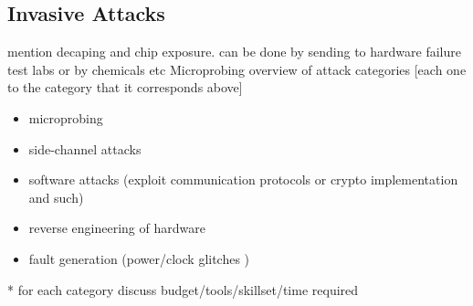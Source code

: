 \documentclass[10pt,a4paper,twocolumn]{article}
\begin{document}
	\subsection{Invasive Attacks}
	mention decaping and chip exposure. can be done by sending to hardware failure test labs\citep{website:hacking_the_pic} or by chemicals etc \citep{anderson:cautionary_note}
	Microprobing
	overview of attack categories [each one to the category that it corresponds above]
	\begin{itemize}
		\item microprobing \\
		\item side-channel attacks \\
		\item software attacks (exploit communication protocols or crypto implementation and such) \\
		\item reverse engineering of hardware\\
		\item fault generation (power/clock glitches ) \\
	\end{itemize}
	
	* for each category discuss budget/tools/skillset/time required\\




	
	
		
	
\end{document}
